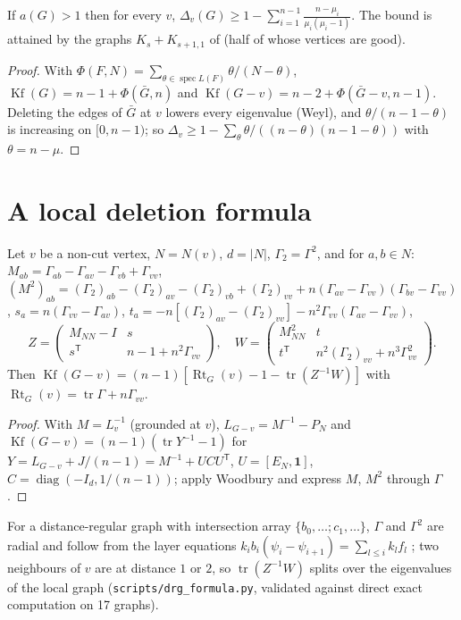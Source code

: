 \documentclass[11pt,a4paper]{report}
\newcommand{\Kf}{\operatorname{Kf}}
\newcommand{\Rt}{\operatorname{Rt}}
\newcommand{\one}{\mathbf{1}}
\begin{document}
\begin{theorem}[note=dense bound]\label{thm:dense}
If $a(G)>1$ then for every $v$,
$\Delta_v(G)\ge1-\sum_{i=1}^{n-1}\frac{n-\mu_i}{\mu_i(\mu_i-1)}$. The bound is attained by the graphs
$K_s+K_{s+1,1}$ of \autocite{GMD26} (half of whose vertices are good).
\end{theorem}
\begin{proof}
With $\Phi(F,N)=\sum_{\theta\in\operatorname{spec}L(F)}\theta/(N-\theta)$, $\Kf(G)=n-1+\Phi(\bar G,n)$ and
$\Kf(G-v)=n-2+\Phi(\bar G-v,n-1)$. Deleting the edges of $\bar G$ at $v$ lowers every eigenvalue (Weyl), and
$\theta/(n-1-\theta)$ is increasing on $[0,n-1)$; so
$\Delta_v\ge1-\sum_\theta\theta/((n-\theta)(n-1-\theta))$ with $\theta=n-\mu$.
\end{proof}

\section{A local deletion formula}
\begin{proposition}\label{prop:local}
Let $v$ be a non-cut vertex, $N=N(v)$, $d=|N|$, $\Gamma_2=\Gamma^2$, and for $a,b\in N$:
$M_{ab}=\Gamma_{ab}-\Gamma_{av}-\Gamma_{vb}+\Gamma_{vv}$,
$(M^2)_{ab}=(\Gamma_2)_{ab}-(\Gamma_2)_{av}-(\Gamma_2)_{vb}+(\Gamma_2)_{vv}+n(\Gamma_{av}-\Gamma_{vv})(\Gamma_{bv}-\Gamma_{vv})$,
$s_a=n(\Gamma_{vv}-\Gamma_{av})$, $t_a=-n[(\Gamma_2)_{av}-(\Gamma_2)_{vv}]-n^2\Gamma_{vv}(\Gamma_{av}-\Gamma_{vv})$,
\[
Z=\begin{pmatrix}M_{NN}-I&s\\s^{\mathsf T}&n-1+n^2\Gamma_{vv}\end{pmatrix},\quad
W=\begin{pmatrix}M^2_{NN}&t\\t^{\mathsf T}&n^2(\Gamma_2)_{vv}+n^3\Gamma_{vv}^2\end{pmatrix}.
\]
Then $\Kf(G-v)=(n-1)[\Rt_G(v)-1-\operatorname{tr}(Z^{-1}W)]$ with $\Rt_G(v)=\operatorname{tr}\Gamma+n\Gamma_{vv}$.
\end{proposition}
\begin{proof}
With $M=L_v^{-1}$ (grounded at $v$), $L_{G-v}=M^{-1}-P_N$ and
$\Kf(G-v)=(n-1)(\operatorname{tr}Y^{-1}-1)$ for $Y=L_{G-v}+J/(n-1)=M^{-1}+UCU^{\mathsf T}$, $U=[E_N,\one]$,
$C=\operatorname{diag}(-I_d,1/(n-1))$; apply Woodbury and express $M$, $M^2$ through $\Gamma$.
\end{proof}
For a distance-regular graph with intersection array $\{b_0,\dots;c_1,\dots\}$, $\Gamma$ and $\Gamma^2$ are
radial and follow from the layer equations $k_ib_i(\psi_i-\psi_{i+1})=\sum_{l\le i}k_lf_l$ \autocite{Biggs93};
two neighbours of $v$ are at distance $1$ or $2$, so $\operatorname{tr}(Z^{-1}W)$ splits over the eigenvalues of the
local graph (\texttt{scripts/drg\_formula.py}, validated against direct exact computation on 17 graphs).
\end{document}
